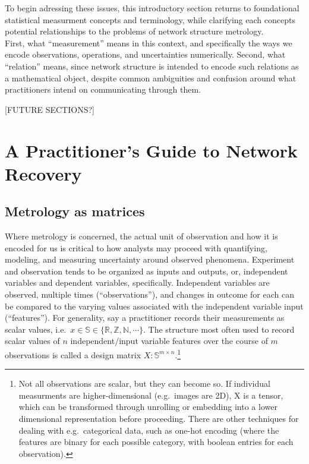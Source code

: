 \documentclass[%
	12pt,
		oneside,
		letterpaper
]{book}
\begin{document}
To begin adressing these issues, this introductory section returns to
foundational statistical measurment concepts and terminology, while
clarifying each concepts potential relationships to the problems of
network structure metrology.\\
First, what ``measurement'' means in this context, and specifically the
ways we encode observations, operations, and uncertainties numerically.
Second, what ``relation'' means, since network structure is intended to
encode such relations as a mathematical object, despite common
ambiguities and confusion around what practitioners intend on
communicating through them.

{[}FUTURE SECTIONS?{]}

\part{A Practitioner's Guide to Network Recovery}

\chapter{Metrology as matrices}\label{metrology-as-matrices}

Where metrology is concerned, the actual unit of observation and how it
is encoded for us is critical to how analysts may proceed with
quantifying, modeling, and measuring uncertainty around observed
phenomena. Experiment and observation tends to be organized as inputs
and outputs, or, independent variables and dependent variables,
specifically. Independent variables are observed, multiple times
(``observations''), and changes in outcome for each can be compared to
the varying values associated with the independent variable input
(``features''). For generality, say a practitioner records their
measurements as scalar values,
i.e.~\(x\in\mathbb{S}\in\{\mathbb{R,Z,N},\cdots\}\). The structure most
often used to record scalar values of \(n\) independent/input variable
features over the course of \(m\) observations is called a design matrix
\(X:\mathbb{S}^{m\times n}\).\footnote{ Not all observations are scalar,
  but they can become so. If individual measurments are
  higher-dimensional (e.g.~images are 2D), X is a tensor, which can be
  transformed through unrolling or embedding into a lower dimensional
  representation before proceeding. There are other techniques for
  dealing with e.g.~categorical data, such as one-hot encoding (where
  the features are binary for each possible category, with boolean
  entries for each observation).}
\end{document}
